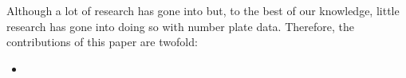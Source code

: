 Although a lot of research has gone into 
but, to the best of our knowledge, little research has gone into doing so with number plate data. Therefore, the contributions of this paper are twofold:

\begin{itemize}
  \item
\end{itemize}


